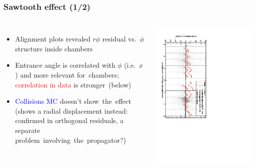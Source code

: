 \documentclass[compress]{beamer}
\begin{document}
\scriptsize

\begin{frame}
\frametitle{Sawtooth effect (1/2)}

\begin{columns}

\vspace{0.2 cm}
\begin{itemize}\setlength{\itemsep}{0.1 cm}
\item Alignment plots revealed $r\phi$ residual vs.~$\phi$ structure inside chambers
\item Entrance angle is correlated with $\phi$ (i.e.~$x$) and more relevant \mbox{for chambers;\hspace{-1 cm}}
\textcolor{red}{correlation in data} is \mbox{stronger (below)\hspace{-1 cm}}
\item \textcolor{blue}{Collisions MC} doesn't \mbox{show the effect\hspace{-0.5 cm}} (shows a radial
  displacement instead: confirmed in orthogonal residuals, a separate
  \mbox{problem involving the propagator?)\hspace{-3 cm}}
\end{itemize}

\includegraphics[height=\linewidth, angle=90]{alignmentplots_example2.pdf}
\end{columns}


\end{frame}
\end{document}
